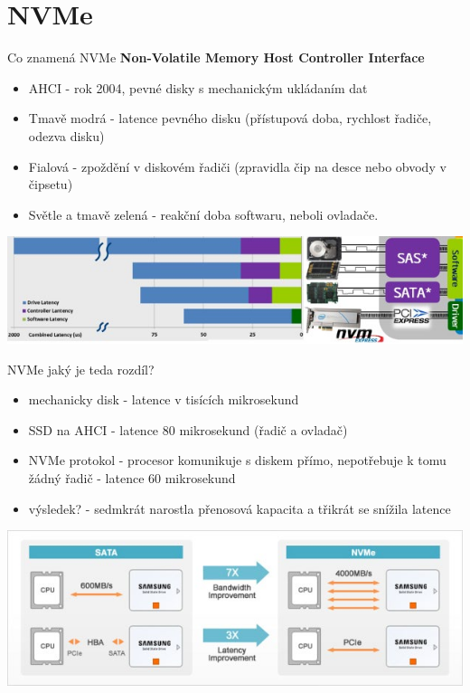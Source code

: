 \documentclass[aspectratio=43]{beamer}
\begin{document}
\section{NVMe}
\begin{frame}{Co znamená NVMe}
	\textbf{Non-Volatile Memory Host Controller Interface}
	\begin{itemize}
		\item AHCI - rok 2004, pevné disky s mechanickým ukládaním dat
		\item Tmavě modrá - latence pevného disku (přístupová doba, rychlost řadiče, odezva disku)
		\item Fialová - zpoždění v diskovém řadiči (zpravidla čip na desce nebo obvody v čipsetu)
		\item Světle a tmavě zelená - reakční doba softwaru, neboli ovladače.
	\end{itemize}
	\begin{center}
		\includegraphics[width=1\linewidth]{extrahovane_obrazky/img_2_page32_1.jpeg}
	\end{center}
	
\end{frame}


\begin{frame}{NVMe jaký je teda rozdíl?}
	\begin{itemize}
		\item mechanicky disk - latence v tisících mikrosekund
		\item SSD na AHCI - latence 80 mikrosekund (řadič a ovladač)
		\item NVMe protokol - procesor komunikuje s diskem přímo, nepotřebuje k tomu žádný řadič - latence 60 mikrosekund
		\item výsledek? - sedmkrát narostla přenosová kapacita a třikrát se snížila latence
	\end{itemize}
	
	\begin{center}
		\includegraphics[width=1\linewidth]{extrahovane_obrazky/img_2_page33_0.jpeg}
	\end{center}
	
\end{frame}
\end{document}
